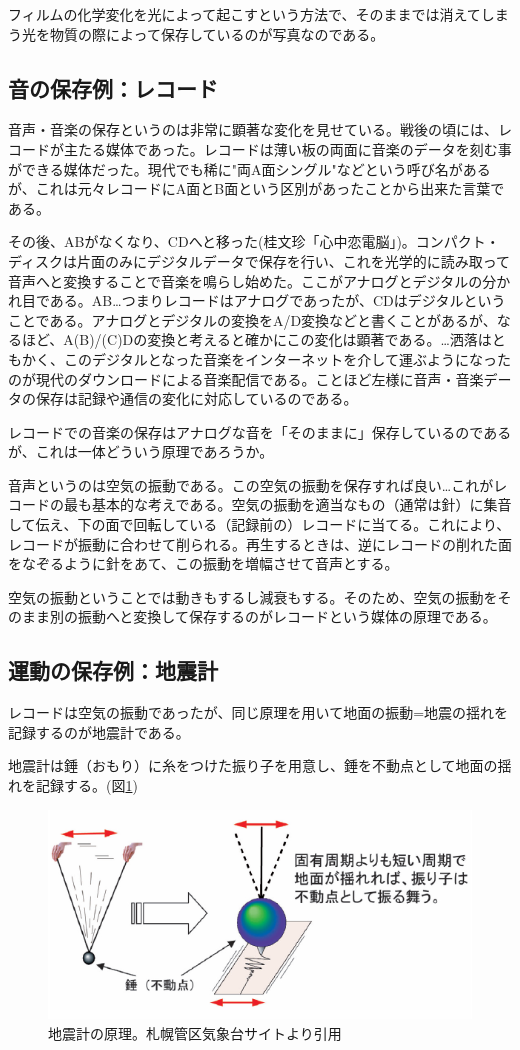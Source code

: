 フィルムの化学変化を光によって起こすという方法で、そのままでは消えてしまう光を物質の際によって保存しているのが写真なのである。

\subsection{音の保存例：レコード}
音声・音楽の保存というのは非常に顕著な変化を見せている。戦後の頃には、レコードが主たる媒体であった。レコードは薄い板の両面に音楽のデータを刻む事ができる媒体だった。現代でも稀に"両A面シングル"などという呼び名があるが、これは元々レコードにA面とB面という区別があったことから出来た言葉である。

その後、ABがなくなり、CDへと移った(桂文珍「心中恋電脳」)。コンパクト・ディスクは片面のみにデジタルデータで保存を行い、これを光学的に読み取って音声へと変換することで音楽を鳴らし始めた。ここがアナログとデジタルの分かれ目である。AB…つまりレコードはアナログであったが、CDはデジタルということである。アナログとデジタルの変換をA/D変換などと書くことがあるが、なるほど、A(B)/(C)Dの変換と考えると確かにこの変化は顕著である。…洒落はともかく、このデジタルとなった音楽をインターネットを介して運ぶようになったのが現代のダウンロードによる音楽配信である。ことほど左様に音声・音楽データの保存は記録や通信の変化に対応しているのである。

レコードでの音楽の保存はアナログな音を「そのままに」保存しているのであるが、これは一体どういう原理であろうか。

音声というのは空気の振動である。この空気の振動を保存すれば良い…これがレコードの最も基本的な考えである。空気の振動を適当なもの（通常は針）に集音して伝え、下の面で回転している（記録前の）レコードに当てる。これにより、レコードが振動に合わせて削られる。再生するときは、逆にレコードの削れた面をなぞるように針をあて、この振動を増幅させて音声とする。

空気の振動ということでは動きもするし減衰もする。そのため、空気の振動をそのまま別の振動へと変換して保存するのがレコードという媒体の原理である。

\subsection{運動の保存例：地震計}
レコードは空気の振動であったが、同じ原理を用いて地面の振動=地震の揺れを記録するのが地震計である。

地震計は錘（おもり）に糸をつけた振り子を用意し、錘を不動点として地面の揺れを記録する。(図\ref{fig2_2})
\begin{figure}[htbp]
\centering
\includegraphics[width=0.6\linewidth,keepaspectratio,bb=0 0 572 283]{fig/fig2_2.png}
\caption{地震計の原理。札幌管区気象台サイトより引用}\label{fig2_2}
\end{figure}

